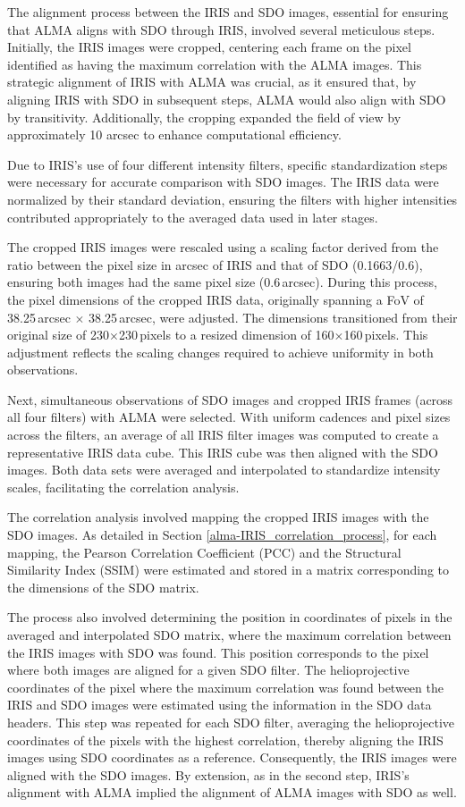 \documentclass[a4paper,alpha-refs]{eSpectra}
\begin{document}
The alignment process between the IRIS and SDO images, essential for ensuring that ALMA aligns with SDO through IRIS, involved several meticulous steps. Initially, the IRIS images were cropped, centering each frame on the pixel identified as having the maximum correlation with the ALMA images. This strategic alignment of IRIS with ALMA was crucial, as it ensured that, by aligning IRIS with SDO in subsequent steps, ALMA would also align with SDO by transitivity. Additionally, the cropping expanded the field of view by approximately 10 arcsec to enhance computational efficiency. 

Due to IRIS's use of four different intensity filters, specific standardization steps were necessary for accurate comparison with SDO images. The IRIS data were normalized by their standard deviation, ensuring the filters with higher intensities contributed appropriately to the averaged data used in later stages.

The cropped IRIS images were rescaled using a scaling factor derived from the ratio between the pixel size in arcsec of IRIS and that of SDO (0.1663/0.6), ensuring both images had the same pixel size (0.6\,arcsec). During this process, the pixel dimensions of the cropped IRIS data, originally spanning a FoV of 38.25\,arcsec $\times$ 38.25\,arcsec, were adjusted. The dimensions transitioned from their original size of 230$\times$230\,pixels to a resized dimension of 160$\times$160\,pixels. This adjustment reflects the scaling changes required to achieve uniformity in both observations.

Next, simultaneous observations of SDO images and cropped IRIS frames (across all four filters) with ALMA were selected. With uniform cadences and pixel sizes across the filters, an average of all IRIS filter images was computed to create a representative IRIS data cube. This IRIS cube was then aligned with the SDO images. 
Both data sets were averaged and interpolated to standardize intensity scales, facilitating the correlation analysis.

The correlation analysis involved mapping the cropped IRIS images with the SDO images. As detailed in Section \ref{alma-IRIS_correlation_process}, for each mapping, the Pearson Correlation Coefficient (PCC) and the Structural Similarity Index (SSIM) were estimated and stored in a matrix corresponding to the dimensions of the SDO matrix.

The process also involved determining the position in coordinates of pixels in the averaged and interpolated SDO matrix, where the maximum correlation between the IRIS images with SDO was found. This position corresponds to the pixel where both images are aligned for a given SDO filter. The helioprojective coordinates of the pixel where the maximum correlation was found between the IRIS and SDO images were estimated using the information in the SDO data headers. This step was repeated for each SDO filter, averaging the helioprojective coordinates of the pixels with the highest correlation, thereby aligning the IRIS images using SDO coordinates as a reference. Consequently, the IRIS images were aligned with the SDO images. By extension, as in the second step, IRIS's alignment with ALMA implied the alignment of ALMA images with SDO as well.
\end{document}
